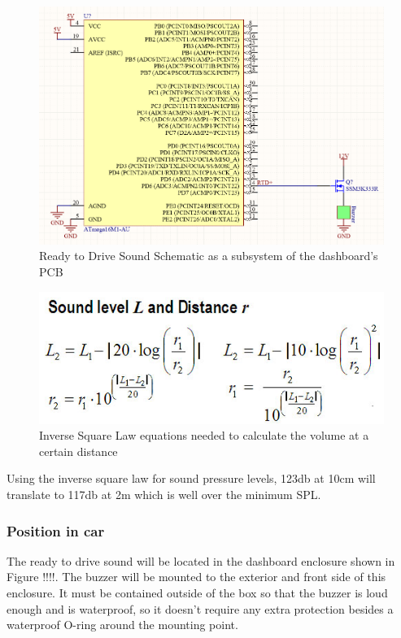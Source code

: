 \documentclass{article}
\begin{document}
\begin{figure}[h]
	\includegraphics[width=\linewidth]{RTDS_Schematic_Simplified}
	\caption{Ready to Drive Sound Schematic as a subsystem of the dashboard's PCB}
\end{figure}
\begin{figure}[H]
	\includegraphics[width=\linewidth]{FormulasForDistanceAndSoundLevel}
	\caption{Inverse Square Law equations needed to calculate the volume at a certain distance}
\end{figure}
Using the inverse square law for sound pressure levels, 123db at 10cm will translate to 117db at 2m which is well over the minimum SPL. 
\subsubsection{Position in car}
The ready to drive sound will be located in the dashboard enclosure shown in Figure !!!!. The buzzer will be mounted
to the exterior and front side of this enclosure. It must be contained outside of the box so that the buzzer is
loud enough and is waterproof, so it doesn't require any extra protection besides a waterproof O-ring around the mounting point.
\end{document}
